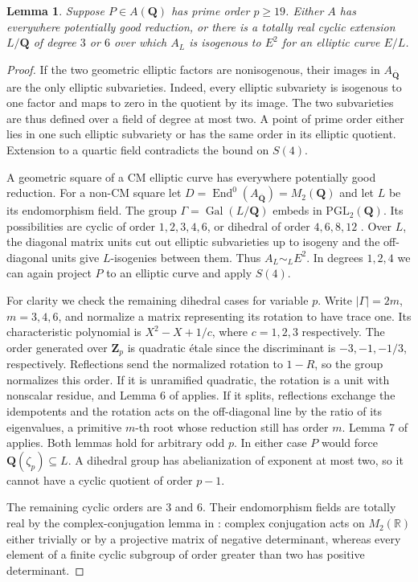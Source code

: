 \documentclass[10pt]{article}
\newcommand{\Q}{\mathbf Q}
\newcommand{\Z}{\mathbf Z}
\DeclareMathOperator{\End}{End}
\DeclareMathOperator{\Gal}{Gal}
\newtheorem{lemma}[theorem]{Lemma}
\begin{document}
\begin{lemma}\label{reduction}
Suppose \(P\in A(\Q)\) has prime order \(p\ge19\). Either \(A\) has everywhere potentially good reduction, or there is a totally real cyclic extension \(L/\Q\) of degree \(3\) or \(6\) over which \(A_L\) is isogenous to \(E^2\) for an elliptic curve \(E/L\).
\end{lemma}
\begin{proof}
If the two geometric elliptic factors are nonisogenous, their images in \(A_{\overline{\Q}}\) are the only elliptic subvarieties. Indeed, every elliptic subvariety is isogenous to one factor and maps to zero in the quotient by its image. The two subvarieties are thus defined over a field of degree at most two. A point of prime order either lies in one such elliptic subvariety or has the same order in its elliptic quotient. Extension to a quartic field contradicts the bound on \(S(4)\).

A geometric square of a CM elliptic curve has everywhere potentially good reduction. For a non-CM square let \(D=\End^0(A_{\overline{\Q}})=M_2(\Q)\) and let \(L\) be its endomorphism field. The group \(\Gamma=\Gal(L/\Q)\) embeds in \(\mathrm{PGL}_2(\Q)\). Its possibilities are cyclic of order \(1,2,3,4,6\), or dihedral of order \(4,6,8,12\) \cite[Section 2]{c31}. Over \(L\), the diagonal matrix units cut out elliptic subvarieties up to isogeny and the off-diagonal units give \(L\)-isogenies between them. Thus \(A_L\sim_L E^2\). In degrees \(1,2,4\) we can again project \(P\) to an elliptic curve and apply \(S(4)\).

For clarity we check the remaining dihedral cases for variable \(p\). Write \(|\Gamma|=2m\), \(m=3,4,6\), and normalize a matrix representing its rotation to have trace one. Its characteristic polynomial is \(X^2-X+1/c\), where \(c=1,2,3\) respectively. The order generated over \(\Z_p\) is quadratic étale since the discriminant is \(-3,-1,-1/3\), respectively. Reflections send the normalized rotation to \(1-R\), so the group normalizes this order. If it is unramified quadratic, the rotation is a unit with nonscalar residue, and Lemma 6 of \cite{c13} applies. If it splits, reflections exchange the idempotents and the rotation acts on the off-diagonal line by the ratio of its eigenvalues, a primitive \(m\)-th root whose reduction still has order \(m\). Lemma 7 of \cite{c13} applies. Both lemmas hold for arbitrary odd \(p\). In either case \(P\) would force \(\Q(\zeta_p)\subseteq L\). A dihedral group has abelianization of exponent at most two, so it cannot have a cyclic quotient of order \(p-1\).

The remaining cyclic orders are \(3\) and \(6\). Their endomorphism fields are totally real by the complex-conjugation lemma in \cite[Section 6]{rank}: complex conjugation acts on \(M_2(\mathbb R)\) either trivially or by a projective matrix of negative determinant, whereas every element of a finite cyclic subgroup of order greater than two has positive determinant.
\end{proof}
\end{document}
